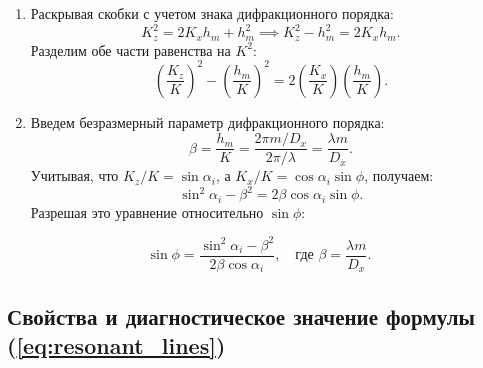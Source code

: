\documentclass[a4paper,11pt]{article}
\begin{document}
\begin{enumerate}
    \item Раскрывая скобки с учетом знака дифракционного порядка:
    \begin{equation}
        K_z^2 = 2 K_x h_m + h_m^2 \implies K_z^2 - h_m^2 = 2 K_x h_m.
    \end{equation}
    Разделим обе части равенства на $K^2$:
    \begin{equation}
        \left(\frac{K_z}{K}\right)^2 - \left(\frac{h_m}{K}\right)^2 = 2 \left(\frac{K_x}{K}\right) \left(\frac{h_m}{K}\right).
    \end{equation}
    \item Введем безразмерный параметр дифракционного порядка:
    \begin{equation}
        \beta = \frac{h_m}{K} = \frac{2\pi m / D_x}{2\pi / \lambda} = \frac{\lambda m}{D_x}.
    \end{equation}
    Учитывая, что $K_z / K = \sin\alpha_i$, а $K_x / K = \cos\alpha_i \sin\phi$, получаем:
    \begin{equation}
        \sin^2\alpha_i - \beta^2 = 2 \beta \cos\alpha_i \sin\phi.
    \end{equation}
    Разрешая это уравнение относительно $\sin\phi$:
\end{enumerate}

\begin{mathbox}
\begin{equation}
    \sin\phi = \frac{\sin^2\alpha_i - \beta^2}{2\beta \cos\alpha_i}, \quad \text{где } \beta = \frac{\lambda m}{D_x}.
    \label{eq:resonant_lines}
\end{equation}
\end{mathbox}

\subsection{Свойства и диагностическое значение формулы (\ref{eq:resonant_lines})}
\end{document}
